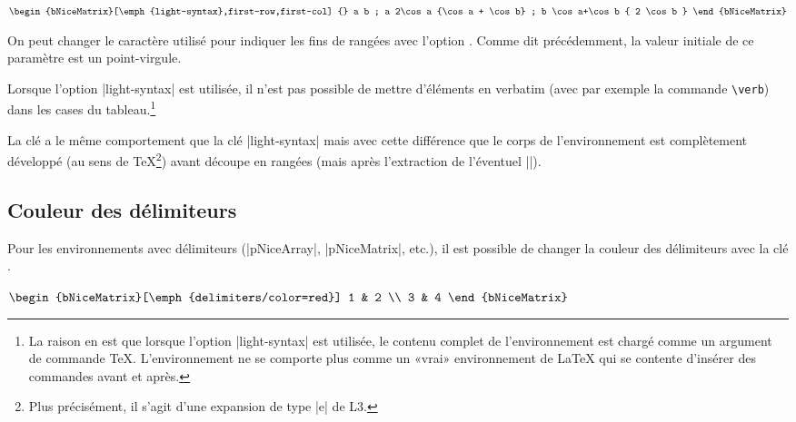 \documentclass[dvipsnames]{article}
\begin{document}
\medskip
\begin{Code}[width=10.5cm,show-output,no-cell-nodes]
$\begin{bNiceMatrix}[\emph{light-syntax},first-row,first-col]
  {} a             b                 ;
  a  2\cos a       {\cos a + \cos b} ;
  b \cos a+\cos b  { 2 \cos b }
\end{bNiceMatrix}$
\end{Code}


\medskip
{}
On peut changer le caractère utilisé pour indiquer les fins de rangées avec
l'option . Comme dit précédemment, la valeur initiale de ce
paramètre est un point-virgule.

\medskip
Lorsque l'option |light-syntax| est utilisée, il n'est pas possible de mettre
d'éléments en verbatim (avec par exemple la commande \texttt{\textbackslash verb}) 
dans les cases du tableau.\footnote{La raison en est que lorsque l'option |light-syntax|
  est utilisée, le contenu complet de l'environnement est chargé comme un
  argument de commande TeX. L'environnement ne se comporte plus comme un «vrai»
  environnement de LaTeX qui se contente d'insérer des commandes avant et
  après.}


\medskip
{} 
La clé  a le même comportement que la clé
|light-syntax| mais avec cette différence que le corps de l'environnement est
complètement développé (au sens de TeX\footnote{Plus précisément, il s'agit
  d'une expansion de type |e| de L3.}) avant découpe en rangées (mais après
l'extraction de l'éventuel |\CodeAfter|).


\subsection{Couleur des délimiteurs}


Pour les environnements avec délimiteurs (|{pNiceArray}|, |{pNiceMatrix}|,
etc.), il est possible de changer la couleur des délimiteurs avec la clé
.

\medskip
\begin{Code}[width=12cm,show-output]
$\begin{bNiceMatrix}[\emph{delimiters/color=red}]
  1 & 2 \\
  3 & 4
\end{bNiceMatrix}$
\end{Code}
\end{document}

